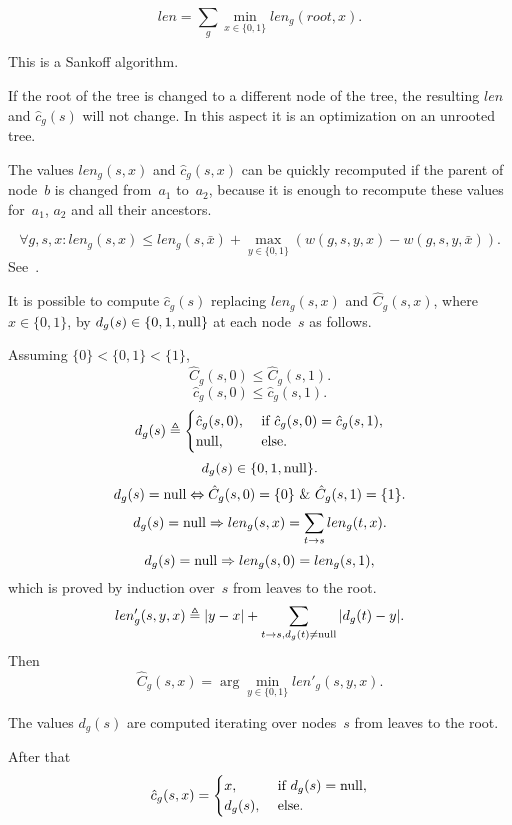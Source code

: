 \documentclass[10pt,a4paper]{article}
\theoremstyle{plain} \newtheorem{Lem}{Lemma}
\begin{document}
$$ len = \sum_g \min_{x \in \{0,1\}} len_g(root,x). $$

This is a Sankoff algorithm.  

If the root of the tree is changed to a different node of the tree, the resulting $len$ and $\hat c_g(s)$ will not change.
In this aspect it is an optimization on an unrooted tree.

The values $len_g(s,x)$ and $\hat c_g(s,x)$ can be quickly recomputed if the parent of node~$b$ is changed from~$a_1$ to~$a_2$, 
because it is enough to recompute these values for~$a_1$, $a_2$ and all their ancestors.

$$ \forall g,s,x : len_g (s,x) \le len_g(s,\bar x) + \max_{y \in \{0,1\}} (w(g,s,y,x) - w(g,s,y,\bar x)). $$
See~\cite{Mirkin03}.


\comm
{
It is possible to compute $\hat c_g(s)$ replacing $len_g(s,x)$ and $\hat C_g(s,x)$, where $x\in \{0,1\}$, by $d_g(s) \in \{0,1,\mathrm {null}\}$ at each node~$s$ as follows.

Assuming $\{0\} < \{0,1\} < \{1\}$, 
$$ \hat C_g(s,0) \le \hat C_g(s,1). $$  
$$ \hat c_g(s,0) \le \hat c_g(s,1). $$
\begin{equation*}
d_g(s) \triangleq 
  \begin{cases}
    \hat c_g(s,0), &\text{ if } \hat c_g(s,0) = \hat c_g(s,1),\\
    \mathrm {null}, &\text{ else.}
  \end{cases}   
\end{equation*}
$$ d_g(s) \in \{0, 1, \mathrm {null} \}. $$
$$ d_g(s) = \mathrm {null} \Leftrightarrow \hat C_g(s,0) = \{0\} \ \& \  \hat C_g(s,1) = \{1\}. $$
$$ d_g(s) = \mathrm {null} \Rightarrow len_g(s,x) = \sum_{t \to s} len_g(t,x). $$
$$ d_g(s) = \mathrm {null} \Rightarrow len_g(s,0) = len_g(s,1), $$
which is proved by induction over~$s$ from leaves to the root.  
$$ len'_g(s,y,x) \triangleq |y - x| + \sum_{t \to s, d_g(t) \not= \mathrm {null}} |d_g(t) - y|. $$
Then
$$ \hat C_g(s,x) = \arg \min_{y \in \{0,1\}} len'_g(s,y,x). $$

The values $d_g(s)$ are computed iterating over nodes~$s$ from leaves to the root.

After that
\begin{equation*}
\hat c_g(s,x) =   \begin{cases}
    x, &\text{ if } d_g(s) = \mathrm {null},\\
    d_g(s), &\text{ else.}
  \end{cases}   
\end{equation*}
}
\end{document}
